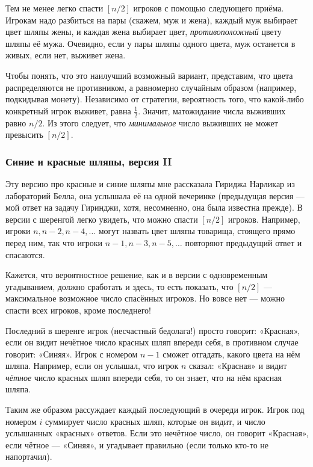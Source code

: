 \medskip

Тем не менее легко спасти $[n/2]$ игроков с помощью следующего приёма.
Игрокам надо разбиться на пары (скажем, муж и жена), каждый муж выбирает цвет шляпы жены, и каждая жена выбирает цвет, \emph{противоположный} цвету шляпы её мужа.
Очевидно, если у пары шляпы одного цвета, муж останется в живых, если нет, выживет жена.

Чтобы понять, что это наилучший возможный вариант, представим, что цвета распределяются не противником, а равномерно случайным образом (например, подкидывая монету).
Независимо от стратегии, вероятность того, что какой-либо конкретный игрок выживет, равна $\tfrac12$.
Значит, матожидание числа выживших равно $n/2$. 
Из этого следует, что \emph{минимальное} число выживших не может превысить $[n/2]$.\heart

\subsubsection*{Синие и красные шляпы, версия II}%

Эту версию про красные и синие шляпы мне рассказала Гириджа Нарликар из лабораторий Белла, %
она услышала её на одной вечеринке (предыдущая версия --- мой ответ на задачу Гиринджи, хотя, несомненно, она была известна прежде).
В версии с шеренгой легко увидеть, что можно спасти $[n/2]$ игроков.
Например, игроки $n, n-2, n-4,\dots$
могут назвать цвет шляпы товарища, стоящего прямо перед ним, так что игроки $n-1, n-3,n-5,\dots$
повторяют предыдущий ответ и спасаются.

\medskip

Кажется, что вероятностное решение, как и в версии с одновременным угадыванием, должно сработать и здесь, то есть показать, что $[n/2]$ --- максимальное возможное число спасённых игроков.
Но вовсе нет --- можно спасти всех игроков, кроме последнего!

Последний в шеренге игрок (несчастный бедолага!) просто говорит:
«Красная», если он видит нечётное число красных шляп впереди себя, в противном случае говорит: «Синяя».
Игрок с номером $n-1$ сможет отгадать, какого цвета на нём шляпа.
Например, если он услышал, что игрок $n$ сказал:
«Красная» и видит \emph{чётное} число красных шляп впереди себя, то он знает, что на нём красная шляпа.

Таким же образом рассуждает каждый последующий в очереди игрок.
Игрок под номером $i$ суммирует число красных шляп, которые он видит, и число услышанных «красных» ответов.
Если это нечётное число, он говорит «Красная», если чётное --- «Синяя», и угадывает правильно (если только кто-то не напортачил).

